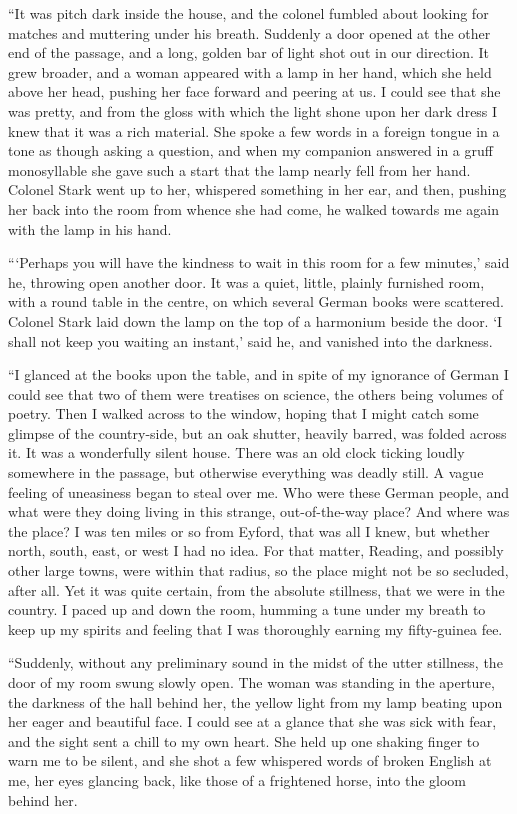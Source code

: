\documentclass{article}
\begin{document}
``It was pitch dark inside the house, and the colonel fumbled about
looking for matches and muttering under his breath. Suddenly a door
opened at the other end of the passage, and a long, golden bar of light
shot out in our direction. It grew broader, and a woman appeared with
a lamp in her hand, which she held above her head, pushing her face
forward and peering at us. I could see that she was pretty, and from
the gloss with which the light shone upon her dark dress I knew that
it was a rich material. She spoke a few words in a foreign tongue in
a tone as though asking a question, and when my companion answered in
a gruff monosyllable she gave such a start that the lamp nearly fell
from her hand. Colonel Stark went up to her, whispered something in her
ear, and then, pushing her back into the room from whence she had come,
he walked towards me again with the lamp in his hand.

```Perhaps you will have the kindness to wait in this room for a few
minutes,' said he, throwing open another door. It was a quiet, little,
plainly furnished room, with a round table in the centre, on which several
German books were scattered. Colonel Stark laid down the lamp on the top
of a harmonium beside the door. `I shall not keep you waiting an instant,'
said he, and vanished into the darkness.

``I glanced at the books upon the table, and in spite of my ignorance
of German I could see that two of them were treatises on science, the
others being volumes of poetry. Then I walked across to the window,
hoping that I might catch some glimpse of the country-side, but an oak
shutter, heavily barred, was folded across it. It was a wonderfully
silent house. There was an old clock ticking loudly somewhere in the
passage, but otherwise everything was deadly still. A vague feeling of
uneasiness began to steal over me. Who were these German people, and what
were they doing living in this strange, out-of-the-way place? And where
was the place? I was ten miles or so from Eyford, that was all I knew,
but whether north, south, east, or west I had no idea. For that matter,
Reading, and possibly other large towns, were within that radius, so
the place might not be so secluded, after all. Yet it was quite certain,
from the absolute stillness, that we were in the country. I paced up and
down the room, humming a tune under my breath to keep up my spirits and
feeling that I was thoroughly earning my fifty-guinea fee.

``Suddenly, without any preliminary sound in the midst of the utter
stillness, the door of my room swung slowly open. The woman was standing
in the aperture, the darkness of the hall behind her, the yellow light
from my lamp beating upon her eager and beautiful face. I could see at a
glance that she was sick with fear, and the sight sent a chill to my own
heart. She held up one shaking finger to warn me to be silent, and she
shot a few whispered words of broken English at me, her eyes glancing
back, like those of a frightened horse, into the gloom behind her.
\end{document}
